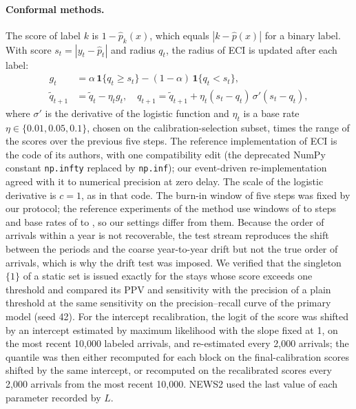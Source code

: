\paragraph{Conformal methods.} The score of label $k$ is $1 - \hat{p}_k(x)$, which equals $|k - \hat{p}(x)|$ for a binary label. With score $s_t = |y_t - \hat{p}_t|$ and radius $q_t$, the radius of ECI is updated after each label:
\begin{align}
g_t &= \alpha\,\mathbf{1}\{q_t \ge s_t\} - (1-\alpha)\,\mathbf{1}\{q_t < s_t\}, \\
\tilde{q}_{t+1} &= \tilde{q}_t - \eta_t g_t, \quad q_{t+1} = \tilde{q}_{t+1} + \eta_t (s_t - q_t)\,\sigma'(s_t - q_t),
\end{align}
where $\sigma'$ is the derivative of the logistic function and $\eta_t$ is a base rate $\eta \in \{0.01, 0.05, 0.1\}$, chosen on the calibration-selection subset, times the range of the scores over the previous five steps. The reference implementation of ECI is the code of its authors, with one compatibility edit (the deprecated NumPy constant \texttt{np.infty} replaced by \texttt{np.inf}); our event-driven re-implementation agreed with it to numerical precision at zero delay. The scale of the logistic derivative is $c = 1$, as in that code. The burn-in window of five steps was fixed by our protocol; the reference experiments of the method use windows of \RVRefBurninLo{} to \RVRefBurninHi{} steps and base rates of \RVRefEtaLo{} to \RVRefEtaHi{}, so our settings differ from them. Because the order of arrivals within a year is not recoverable, the test stream reproduces the shift between the periods and the coarse year-to-year drift but not the true order of arrivals, which is why the drift test was imposed. We verified that the singleton $\{1\}$ of a static set is issued exactly for the stays whose score exceeds one threshold and compared its PPV and sensitivity with the precision of a plain threshold at the same sensitivity on the precision--recall curve of the primary model (seed 42). For the intercept recalibration, the logit of the score was shifted by an intercept estimated by maximum likelihood with the slope fixed at 1, on the most recent 10{,}000 labeled arrivals, and re-estimated every 2{,}000 arrivals; the quantile was then either recomputed for each block on the final-calibration scores shifted by the same intercept, or recomputed on the recalibrated scores every 2{,}000 arrivals from the most recent 10{,}000. NEWS2 used the last value of each parameter recorded by $L$.

